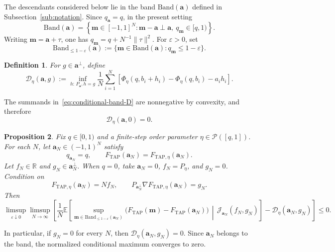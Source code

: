 \documentclass[a4paper,10pt,reqno]{amsart}
\numberwithin{equation}{section}
\newtheorem{proposition}{Proposition}[section]
\newtheorem{definition}[proposition]{Definition}%
\newcommand{\dR}{\mathbb{R}}%
\newcommand{\ve}{\varepsilon}
\newcommand{\dE}{\mathbb{E}}%
\newcommand{\mc}{\mathcal}
\newcommand{\TAP}{\mathrm{TAP}}
\newcommand{\Band}{\mathrm{Band}}
\newcommand{\bfm}{\mathbf{m}}
\newcommand{\bfa}{\mathbf{a}}
\begin{document}
	The descendants considered below lie in the band
	$\Band(\bfa)$ defined in Subsection~\ref{sub:notation}. Since
	$q_\bfa=q$, in the present setting
	\[
	\Band(\bfa)
	=
	\left\{
	\bfm\in[-1,1]^N:
	\bfm-\bfa\perp\bfa,
	\ q_\bfm\in[q,1)
	\right\}.
	\]
	Writing $\bfm=\bfa+\tau$, one has
	$q_\bfm=q+N^{-1}\|\tau\|^2$. For $\ve>0$, set
	\[
	\Band_{\le1-\ve}(\bfa)
	:=
	\{\bfm\in\Band(\bfa):q_\bfm\le1-\ve\}.
	\]
	
	\begin{definition}
		For $g\in\bfa^\perp$, define
		\begin{equation}\label{eq:conditional-band-D}
			\mathscr D_\eta(\bfa,g)
			:=
			\inf_{h:\,P_{\bfa^\perp}h=g}
			\frac1N\sum_{i=1}^N
			\left[
			\Phi_\eta(q,b_i+h_i)
			-\Phi_\eta(q,b_i)
			-a_i h_i
			\right].
		\end{equation}
	\end{definition}
	
	The summands in~\eqref{eq:conditional-band-D} are nonnegative by
	convexity, and therefore
	\[
	\mathscr D_\eta(\bfa,0)=0.
	\]
	
	\begin{proposition}\label{prop:cond-band-noncrit}
		Fix $q\in[0,1)$ and a finite-step order parameter
		$\eta\in\mc P([q,1])$. For each \(N\), let
		\(\bfa_N\in(-1,1)^N\) satisfy
		\[
		q_{\bfa_N}=q,
		\qquad
		F_{\TAP}(\bfa_N)=F_{\TAP,\eta}(\bfa_N).
		\]
		Let \(f_N\in\dR\) and \(g_N\in\bfa_N^\perp\). When \(q=0\), take
		\(\bfa_N=0\), \(f_N=P_\eta\), and \(g_N=0\). Condition on
		\[
		F_{\TAP,\eta}(\bfa_N)=Nf_N,
		\qquad
		P_{\bfa_N^\perp}\nabla F_{\TAP,\eta}(\bfa_N)=g_N.
		\]
		Then
		\[
		\limsup_{\ve\downarrow0}
		\limsup_{N\to\infty}
		\left[
		\frac1N
		\dE\left[
		\sup_{\bfm\in\Band_{\le1-\ve}(\bfa_N)}
		\bigl(
		F_{\TAP}(\bfm)-F_{\TAP}(\bfa_N)
		\bigr)
		\,\middle|\,
		\mc J_{\bfa_N}(f_N,g_N)
		\right]
		-
		\mathscr D_\eta(\bfa_N,g_N)
		\right]
		\le0.
		\]
	\end{proposition}
	
	In particular, if \(g_N=0\) for every \(N\), then
	\(\mathscr D_\eta(\bfa_N,g_N)=0\). Since \(\bfa_N\) belongs to the
	band, the normalized conditional maximum converges to zero.
	
	
	
\end{document}
